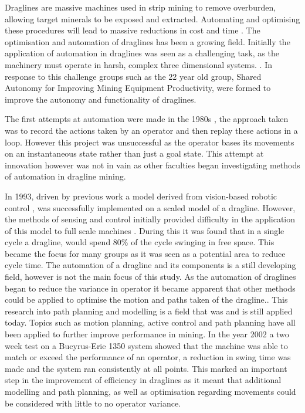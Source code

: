 Draglines are massive machines used in strip mining to remove overburden, allowing target minerals to be exposed and extracted\cite{IntoOpenPit}. Automating and optimising these procedures will lead to massive reductions in cost and time \cite{AutoEarthmoving}. The optimisation and automation of draglines has been a growing field. Initially the application of automation in draglines was seen as a challenging task, as the machinery must operate in harsh, complex three dimensional systems. \cite{IntroRobo}. In response to this challenge groups such as the 22 year old \cite{DraglineDecade} group, Shared Autonomy for Improving Mining Equipment Productivity, were formed to improve the autonomy and functionality of draglines.

The first attempts at automation were made in the 1980s \cite{CreativeEngineering}, the approach taken was to record the actions taken by an operator and then replay these actions in a loop. However this project was unsuccessful as the operator bases its movements on an instantaneous state\cite{CreativeEngineering} rather than just a goal state. This attempt at innovation however was not in vain as other faculties began investigating methods of automation in dragline mining.

In 1993, driven by previous work a model derived from vision-based robotic control \cite{VisionRobot}, was successfully implemented on a scaled model of a dragline. However, the methods of sensing and control initially provided difficulty in the application of this model to full scale machines \cite{DraglineDecade}. During this it was found that in a single cycle a dragline,  would spend 80\% of the cycle swinging in free space. \cite{DraglineDecade} This became the focus for many groups as it was seen as a potential area to reduce cycle time. The automation of a dragline and its components is a still developing field\cite{AutoEarthmoving}, however is not the main focus of this study. As the automation of draglines began to reduce the variance in operator it became apparent that other methods could be applied to optimise the motion and paths taken of the dragline.\cite{OperatorPerformance}. This research into path planning and modelling is a field that was and is still applied today. Topics such as motion planning, active control and path planning have all been applied to further improve performance in mining.\cite{DraglineDecade} In the year 2002 a two week test on a Bucyrus-Erie 1350 system showed that the machine was able to match or exceed the performance of an operator, a reduction in swing time was made and the system ran consistently at all points. \cite{DraglineDecade} This marked  an important step in the improvement of efficiency in draglines as it meant that additional modelling and path planning, as well as optimisation regarding movements could be considered with little to no operator variance\cite{IntroRobo}.

